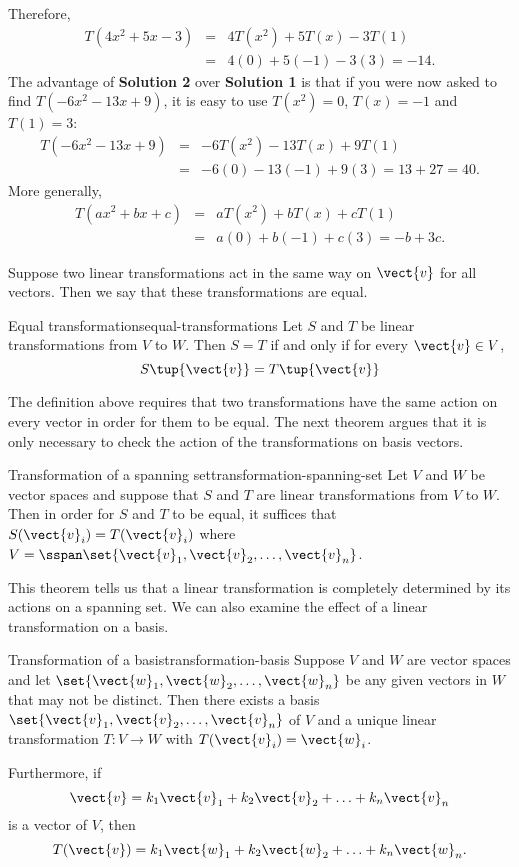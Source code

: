 \begin{solution}
Therefore,
\begin{eqnarray*}
T(4x^2+5x-3) & = & 4T(x^2) + 5T(x) -3T(1) \\
& = & 4(0) + 5(-1) - 3(3)=-14.
\end{eqnarray*}
The advantage of \textbf{Solution 2} over \textbf{Solution 1} is that 
if you were now asked to find $T(-6x^2-13x+9)$, it is easy to
use $T(x^2)=0$, $T(x)=-1$ and $T(1)= 3$:
\begin{eqnarray*}
T(-6x^2-13x+9) & = & -6T(x^2)-13T(x)+9T(1) \\
& = & -6(0)-13(-1)+9(3)=13+27=40.
\end{eqnarray*}
More generally, 
\begin{eqnarray*}
T(ax^2+bx+c) & = & aT(x^2)+bT(x)+cT(1) \\
& = & a(0)+b(-1)+c(3)=-b+3c.
\end{eqnarray*}
\end{solution}

Suppose two linear transformations act in the same way on $\vect{v}$ for all vectors. Then we say that these transformations are equal.

\begin{definition}{Equal transformations}{equal-transformations}
Let $S$ and $T$ be linear transformations from $V$ to $W$. Then $S = T$ if and only if for every $\vect{v} \in V$, 
\[
S \tup{\vect{v} } = T \tup{\vect{v} }
\]
\end{definition}

The definition above requires that two transformations have the same action on every vector in order for them to be equal. The next theorem argues that it is only necessary to check the action of the transformations on basis vectors.

\begin{theorem}{Transformation of a spanning set}{transformation-spanning-set}
Let $V$ and $W$ be vector spaces and suppose that $S$ and $T$ are linear transformations from $V$ to $W$. Then in order for $S$ and $T$ to be equal, it suffices that $S(\vect{v}_i) = T(\vect{v}_i)$ where $V=\sspan \set{\vect{v}_1, \vect{v}_2, \ldots, \vect{v}_n}$.
\end{theorem}

This theorem tells us that a linear transformation is completely
determined by its actions on a spanning set. We can also examine the effect of a linear transformation on a basis.

\begin{theorem}{Transformation of a basis}{transformation-basis}
Suppose $V$ and $W$ are vector spaces and let $\set{\vect{w}_1, \vect{w}_2, \ldots, \vect{w}_n}$ be any given vectors in $W$ that may not be distinct. Then there exists a basis $\set{\vect{v}_1, \vect{v}_2, \ldots, \vect{v}_n}$ of $V$ and a unique linear transformation $T: V \to W$ with $T (\vect{v}_i) = \vect{w}_i$.

Furthermore, if 
\[ \vect{v} = k_1\vect{v}_1+k_2\vect{v}_2+\ldots+ k_n\vect{v}_n\]
is a vector of $V$, then
\[ T(\vect{v}) = k_1\vect{w}_1+k_2\vect{w}_2+\ldots+ k_n\vect{w}_n.\]
\end{theorem}
